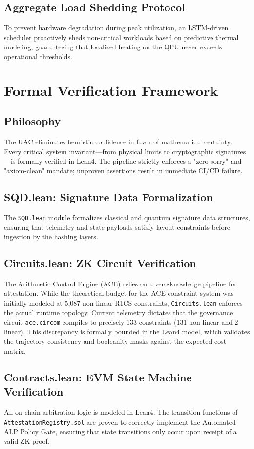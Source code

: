 \documentclass[11pt,a4paper]{article}
\begin{document}
\subsection{Aggregate Load Shedding Protocol}
To prevent hardware degradation during peak utilization, an LSTM-driven scheduler proactively sheds non-critical workloads based on predictive thermal modeling, guaranteeing that localized heating on the QPU never exceeds operational thresholds.

\section{Formal Verification Framework}
\subsection{Philosophy}
The UAC eliminates heuristic confidence in favor of mathematical certainty. Every critical system invariant—from physical limits to cryptographic signatures—is formally verified in Lean4. The pipeline strictly enforces a "zero-sorry" and "axiom-clean" mandate; unproven assertions result in immediate CI/CD failure.

\subsection{SQD.lean: Signature Data Formalization}
The \texttt{SQD.lean} module formalizes classical and quantum signature data structures, ensuring that telemetry and state payloads satisfy layout constraints before ingestion by the hashing layers.

\subsection{Circuits.lean: ZK Circuit Verification}
The Arithmetic Control Engine (ACE) relies on a zero-knowledge pipeline for attestation. While the theoretical budget for the ACE constraint system was initially modeled at 5,087 non-linear R1CS constraints, \texttt{Circuits.lean} enforces the actual runtime topology. Current telemetry dictates that the governance circuit \texttt{ace.circom} compiles to precisely 133 constraints (131 non-linear and 2 linear). This discrepancy is formally bounded in the Lean4 model, which validates the trajectory consistency and booleanity masks against the expected cost matrix.

\subsection{Contracts.lean: EVM State Machine Verification}
All on-chain arbitration logic is modeled in Lean4. The transition functions of \texttt{AttestationRegistry.sol} are proven to correctly implement the Automated ALP Policy Gate, ensuring that state transitions only occur upon receipt of a valid ZK proof.
\end{document}
